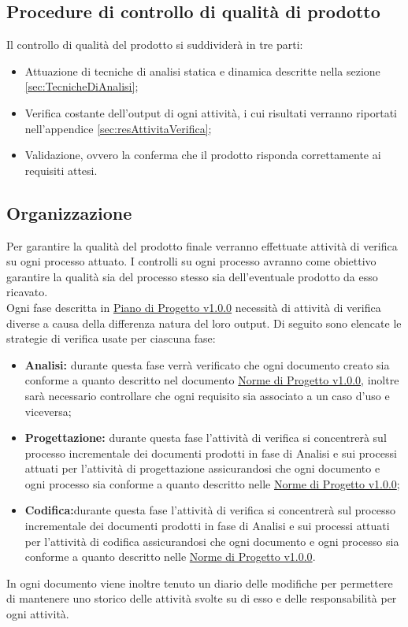 \documentclass{scalatekids-article}
\begin{document}
\subsection{Procedure di controllo di qualità di prodotto}
Il controllo di qualità del prodotto si suddividerà in tre parti:
\begin{itemize}
\item{Attuazione di tecniche di analisi statica e dinamica descritte nella sezione \ref{sec:TecnicheDiAnalisi};}
\item{Verifica costante dell'output di ogni attività, i cui risultati verranno riportati nell'appendice \ref{sec:resAttivitaVerifica};}
\item{Validazione, ovvero la conferma che il prodotto risponda correttamente ai requisiti attesi.}
\end{itemize}
\subsection{Organizzazione}
Per garantire la qualità del prodotto finale verranno effettuate attività di verifica su ogni processo attuato. I controlli su ogni processo avranno come obiettivo garantire la qualità sia del processo stesso sia dell'eventuale prodotto da esso ricavato.\\
Ogni fase descritta in \href{run:./PianoDiProgetto\_v1.0.0.pdf}{Piano di Progetto v1.0.0} necessità di attività di verifica diverse a causa della differenza natura del loro output. Di seguito sono elencate le strategie di verifica usate per ciascuna fase:
\begin{itemize}
\item\textbf{Analisi:} durante questa fase verrà verificato che ogni documento creato sia conforme a quanto descritto nel documento \href{run:../Interni/NormeDiProgetto\_v1.0.0.pdf}{Norme di Progetto v1.0.0}, inoltre sarà necessario controllare che ogni requisito sia associato a un caso d'uso e viceversa;
\item\textbf{Progettazione:} durante questa fase l'attività di verifica si concentrerà sul processo incrementale dei documenti prodotti in fase di Analisi e sui processi attuati per l'attività di progettazione assicurandosi che ogni documento e ogni processo sia conforme a quanto descritto nelle \href{run:../Interni/NormeDiProgetto\_v1.0.0.pdf}{Norme di Progetto v1.0.0};
\item\textbf{Codifica:}durante questa fase l'attività di verifica si concentrerà sul processo incrementale dei documenti prodotti in fase di Analisi e sui processi attuati per l'attività di codifica assicurandosi che ogni documento e ogni processo sia conforme a quanto descritto nelle \href{run:../Interni/NormeDiProgetto\_v1.0.0.pdf}{Norme di Progetto v1.0.0}.
\end{itemize}
In ogni documento viene inoltre tenuto un diario delle modifiche per permettere di mantenere uno storico delle attività svolte su di esso e delle responsabilità per ogni attività.
\end{document}
